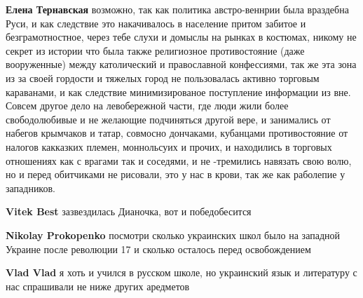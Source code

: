 \begin{itemize}
\begin{itemize}
 
\textbf{Елена Тернавская} возможно, так как политика австро-веннрии была
враздебна Руси, и как следствие это накачивалось в население притом забитое и
безграмотностное, через тебе слухи и домыслы на рынках в костюмах, никому не
секрет из истории что была также религиозное противостояние (даже вооруженные)
между католический и православной конфессиями, так же эта зона из за своей
гордости и тяжелых город не пользовалась активно торговым караванами, и как
следствие минимизированое поступление информации из вне. Совсем другое дело на
левобережной части, где люди жили более свободолюбивые и не желающие
подчиняться другой вере, и занимались от набегов крымчаков и татар, совмосно
дончаками, кубанцами противостояние от налогов какказких племен, моннольсуих и
прочих, и находились в торговых отношениях как с врагами так и соседями, и не
-тремились навязать свою волю, но и перед обитчиками не рисовали, это у нас в
крови, так же как раболепие у западников.

 
\textbf{Vitek Best} зазвездилась Дианочка, вот и победобесится

 
\textbf{Nikolay Prokopenko} посмотри сколько украинских школ было на западной Украине после революции 17 и сколько осталось перед освобождением

 
\textbf{Vlad Vlad} я хоть и учился в русском школе, но украинский язык и литературу с нас спрашивали не ниже других аредметов


\end{itemize}
\end{itemize}

